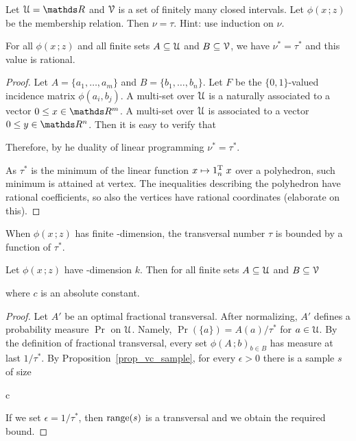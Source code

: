 \documentclass[scombinatorics.tex]{subfiles}
\begin{document}
\begin{exercise}
Let $\U=\RR$ and $\EuScript V$ is a set of finitely many closed intervals.
Let $\phi(x\,;z)$ be the membership relation.
Then $\nu=\tau$.
Hint: use induction on $\nu$.\QED
\end{exercise}

\begin{theorem}\label{thm_fractional_nu=tau}
 For all $\phi(x\,;z)$ and all finite sets $A\subseteq\EuScript U$ and $B\subseteq\EuScript V$, we have $\nu^*=\tau^*$ and this value is rational.
\end{theorem}
\begin{proof}
Let $A=\{a_1,\dots,a_m\}$ and $B=\{b_1,\dots,b_n\}$.
Let $F$ be the $\{0,1\}$-valued incidence matrix $\phi(a_i,b_j)$.
A multi-set over $\EuScript U$ is a naturally associated to a vector $0\le x\in\RR^m$.
A multi-set over $\EuScript U$ is associated to a vector $0\le y\in\RR^n$.
Then it is easy to verify that



Therefore, by he duality of linear programming $\nu^*=\tau^*$.

As $\tau^*$ is the minimum of the linear function $x\mapsto 1_n^{\rm T}\;x$ over a polyhedron, such minimum is attained at vertex.
The inequalities describing the polyhedron have rational coefficients, so also the vertices have rational coordinates (elaborate on this).
\end{proof}

When $\phi(x\,;z)$ has finite \vc-dimension, the transversal number $\tau$ is bounded by a function of $\tau^*$. 

\begin{proposition}\label{prop_bound_fractional_trans}
  Let $\phi(x\,;z)$ have \vc-dimension $k$.
  Then for all finite sets $A\subseteq\EuScript U$ and $B\subseteq\EuScript V$
  
  
  where $c$ is an absolute constant.
\end{proposition}
  
\begin{proof}
  Let $A'$ be an optimal fractional transversal.
  After normalizing, $A'$ defines a probability measure $\Pr$ on $\EuScript U$.
  Namely, $\Pr(\{a\})=A(a)/\tau^*$ for $a\in\EuScript U$.
  By the definition of fractional transversal, every set $\phi(A\,;b)_{b\in B}$ has measure at last $1/\tau^*$.
  By Proposition~\ref{prop_vc_sample}, for every $\epsilon>0$ there is a sample $s$ of size
  
  {\le}
  {c\,\log{}}

  If we set $\epsilon=1/\tau^*$, then $\mathop{\rm range}(s)$ is a transversal and we obtain the required bound.
\end{proof}
\end{document}
